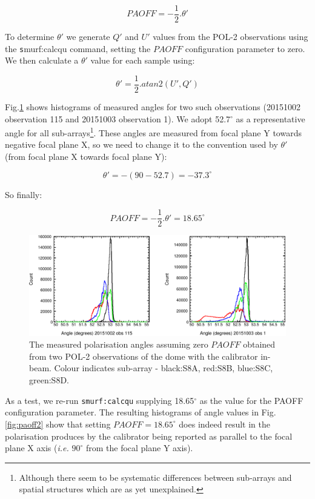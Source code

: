 \documentclass[twoside,11pt]{starlink}
\begin{document}
\[ PAOFF = -\frac{1}{2}.\theta' \]

To determine $\theta'$ we generate $Q'$ and $U'$ values from the POL-2
observations using the {\texttt smurf:calcqu} command, setting the $PAOFF$
configuration parameter to zero. We then calculate a $\theta'$ value for
each sample using:

\[ \theta' = \frac{1}{2}.atan2( U' ,Q' ) \]

Fig.\ref{fig:paoff} shows histograms of measured angles for two such
observations (20151002 observation 115 and 20151003 observation 1). We
adopt 52.7$^\circ$ as a representative angle for all
sub-arrays\footnote{Although there seem to be systematic differences
between sub-arrays and spatial structures which are as yet unexplained.}.
These angles are measured from focal plane Y towards negative focal plane
X, so we need to change it to the convention used by $\theta'$ (from
focal plane X towards focal plane Y):

\[ \theta' = -( 90 - 52.7 ) = -37.3^\circ \]

So finally:

\[ PAOFF = -\frac{1}{2}.\theta' = 18.65^\circ \]

\begin{figure}
\includegraphics[width=\columnwidth]{paoff}
\caption{The measured polarisation angles assuming zero
$PAOFF$ obtained from two POL-2 observations of the dome with the calibrator
in-beam. Colour indicates sub-array - black:S8A, red:S8B, blue:S8C,
green:S8D.}
\label{fig:paoff}
\end{figure}

As a test, we re-run \texttt{smurf:calcqu} supplying 18.65$^\circ$ as the value
for the PAOFF configuration parameter. The resulting histograms of angle
values in Fig.\ref{fig:paoff2} show that setting $PAOFF = 18.65^\circ$
does indeed result in the polarisation produces by the calibrator being
reported as parallel to the focal plane X axis (\emph{i.e.} $90^\circ$
from the focal plane Y axis).
\end{document}
